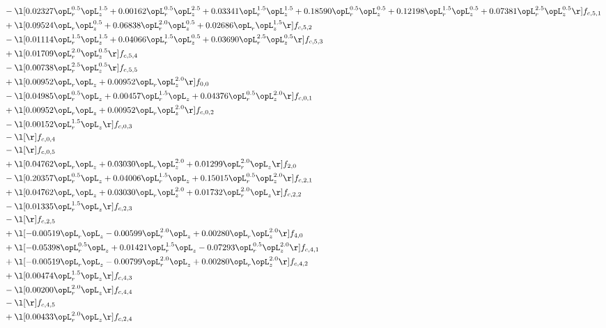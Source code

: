 \begin{alignat}{2}
& - \l[  0.02327 \opL_r^{0.5} \opL_z^{1.5} +  0.00162 \opL_r^{0.5} \opL_z^{2.5} +  0.03341 \opL_r^{1.5} \opL_z^{1.5} +  0.18590 \opL_r^{0.5} \opL_z^{0.5} +  0.12198 \opL_r^{1.5} \opL_z^{0.5} +  0.07381 \opL_r^{2.5} \opL_z^{0.5}  \r] f_{c,5,1} \nonumber \\ 
& + \l[  0.09524 \opL_r \opL_z^{0.5} +  0.06838 \opL_r^{2.0} \opL_z^{0.5} +  0.02686 \opL_r \opL_z^{1.5}  \r] f_{c,5,2} \nonumber \\ 
& - \l[  0.01114 \opL_r^{1.5} \opL_z^{1.5} +  0.04066 \opL_r^{1.5} \opL_z^{0.5} +  0.03690 \opL_r^{2.5} \opL_z^{0.5}  \r] f_{c,5,3} \nonumber \\ 
& + \l[  0.01709 \opL_r^{2.0} \opL_z^{0.5}  \r] f_{c,5,4} \nonumber \\ 
& - \l[  0.00738 \opL_r^{2.5} \opL_z^{0.5}  \r] f_{c,5,5} \nonumber \\ 
& + \l[  0.00952 \opL_r \opL_z +  0.00952 \opL_r \opL_z^{2.0}  \r] f_{0,0} \nonumber \\ 
& - \l[  0.04985 \opL_r^{0.5} \opL_z +  0.00457 \opL_r^{1.5} \opL_z +  0.04376 \opL_r^{0.5} \opL_z^{2.0}  \r] f_{c,0,1} \nonumber \\ 
& + \l[  0.00952 \opL_r \opL_z +  0.00952 \opL_r \opL_z^{2.0}  \r] f_{c,0,2} \nonumber \\ 
& - \l[  0.00152 \opL_r^{1.5} \opL_z  \r] f_{c,0,3} \nonumber \\ 
& - \l[  \r] f_{c,0,4} \nonumber \\ 
& - \l[  \r] f_{c,0,5} \nonumber \\ 
& + \l[  0.04762 \opL_r \opL_z +  0.03030 \opL_r \opL_z^{2.0} +  0.01299 \opL_r^{2.0} \opL_z  \r] f_{2,0} \nonumber \\ 
& - \l[  0.20357 \opL_r^{0.5} \opL_z +  0.04006 \opL_r^{1.5} \opL_z +  0.15015 \opL_r^{0.5} \opL_z^{2.0}  \r] f_{c,2,1} \nonumber \\ 
& + \l[  0.04762 \opL_r \opL_z +  0.03030 \opL_r \opL_z^{2.0} +  0.01732 \opL_r^{2.0} \opL_z  \r] f_{c,2,2} \nonumber \\ 
& - \l[  0.01335 \opL_r^{1.5} \opL_z  \r] f_{c,2,3} \nonumber \\ 
& - \l[  \r] f_{c,2,5} \nonumber \\ 
& + \l[  -0.00519 \opL_r \opL_z   -0.00599 \opL_r^{2.0} \opL_z +  0.00280 \opL_r \opL_z^{2.0}  \r] f_{4,0} \nonumber \\ 
& + \l[  -0.05398 \opL_r^{0.5} \opL_z +  0.01421 \opL_r^{1.5} \opL_z   -0.07293 \opL_r^{0.5} \opL_z^{2.0}  \r] f_{c,4,1} \nonumber \\ 
& + \l[  -0.00519 \opL_r \opL_z   -0.00799 \opL_r^{2.0} \opL_z +  0.00280 \opL_r \opL_z^{2.0}  \r] f_{c,4,2} \nonumber \\ 
& + \l[  0.00474 \opL_r^{1.5} \opL_z  \r] f_{c,4,3} \nonumber \\ 
& - \l[  0.00200 \opL_r^{2.0} \opL_z  \r] f_{c,4,4} \nonumber \\ 
& - \l[  \r] f_{c,4,5} \nonumber \\ 
& + \l[  0.00433 \opL_r^{2.0} \opL_z  \r] f_{c,2,4} \nonumber \\ 
\end{alignat} 



